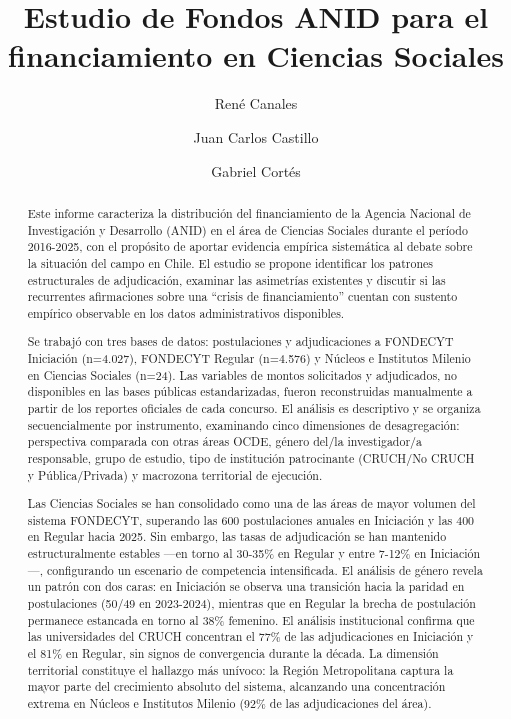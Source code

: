 \documentclass[
  12pt,
  letterpaper,
]{article}
\title{Estudio de Fondos ANID para el financiamiento en Ciencias
Sociales}
\author{René Canales}
\affil{%
                  Departmento de Sociología, Universidad de Chile
              }
\author{Juan Carlos Castillo}
\affil{%
                  Department of Sociología, Universidad de Chile
              }
\author{Gabriel Cortés}
\affil{%
                  Dirección de Investigación Ciencias Sociales,
                  Universidad de Chile
              }
\date{}
\begin{document}
\maketitle
\begin{abstract}
Este informe caracteriza la distribución del financiamiento de la
Agencia Nacional de Investigación y Desarrollo (ANID) en el área de
Ciencias Sociales durante el período 2016-2025, con el propósito de
aportar evidencia empírica sistemática al debate sobre la situación del
campo en Chile. El estudio se propone identificar los patrones
estructurales de adjudicación, examinar las asimetrías existentes y
discutir si las recurrentes afirmaciones sobre una ``crisis de
financiamiento'' cuentan con sustento empírico observable en los datos
administrativos disponibles.

Se trabajó con tres bases de datos: postulaciones y adjudicaciones a
FONDECYT Iniciación (n=4.027), FONDECYT Regular (n=4.576) y Núcleos e
Institutos Milenio en Ciencias Sociales (n=24). Las variables de montos
solicitados y adjudicados, no disponibles en las bases públicas
estandarizadas, fueron reconstruidas manualmente a partir de los
reportes oficiales de cada concurso. El análisis es descriptivo y se
organiza secuencialmente por instrumento, examinando cinco dimensiones
de desagregación: perspectiva comparada con otras áreas OCDE, género
del/la investigador/a responsable, grupo de estudio, tipo de institución
patrocinante (CRUCH/No CRUCH y Pública/Privada) y macrozona territorial
de ejecución.

Las Ciencias Sociales se han consolidado como una de las áreas de mayor
volumen del sistema FONDECYT, superando las 600 postulaciones anuales en
Iniciación y las 400 en Regular hacia 2025. Sin embargo, las tasas de
adjudicación se han mantenido estructuralmente estables ---en torno al
30-35\% en Regular y entre 7-12\% en Iniciación---, configurando un
escenario de competencia intensificada. El análisis de género revela un
patrón con dos caras: en Iniciación se observa una transición hacia la
paridad en postulaciones (50/49 en 2023-2024), mientras que en Regular
la brecha de postulación permanece estancada en torno al 38\% femenino.
El análisis institucional confirma que las universidades del CRUCH
concentran el 77\% de las adjudicaciones en Iniciación y el 81\% en
Regular, sin signos de convergencia durante la década. La dimensión
territorial constituye el hallazgo más unívoco: la Región Metropolitana
captura la mayor parte del crecimiento absoluto del sistema, alcanzando
una concentración extrema en Núcleos e Institutos Milenio (92\% de las
adjudicaciones del área).


\end{abstract}
\end{document}
